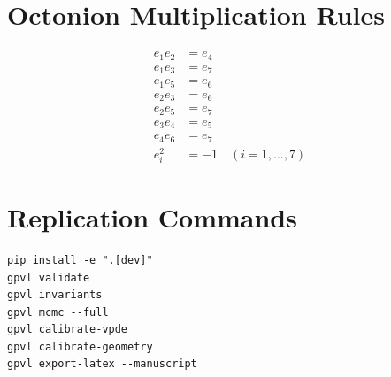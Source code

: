 \appendix
\section{Octonion Multiplication Rules}
\label{app:octonion}
\begin{align}
e_1 e_2 &= e_4 \\
e_1 e_3 &= e_7 \\
e_1 e_5 &= e_6 \\
e_2 e_3 &= e_6 \\
e_2 e_5 &= e_7 \\
e_3 e_4 &= e_5 \\
e_4 e_6 &= e_7 \\
e_i^2 &= -1 \quad (i = 1,\ldots,7)
\end{align}

\section{Replication Commands}
\label{app:replication}
\begin{verbatim}
pip install -e ".[dev]"
gpvl validate
gpvl invariants
gpvl mcmc --full
gpvl calibrate-vpde
gpvl calibrate-geometry
gpvl export-latex --manuscript
\end{verbatim}
